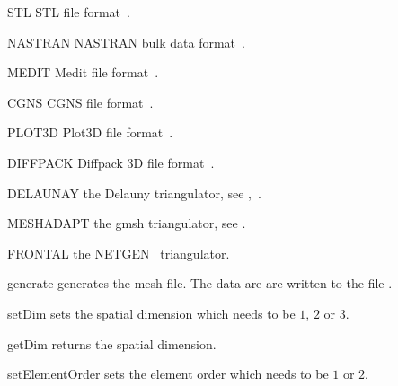 \begin{memberdesc}[Design]{STL}
STL file format~\cite{STL}. 
\end{memberdesc}
\begin{memberdesc}[Design]{NASTRAN}
NASTRAN  bulk data format~\cite{NASTRAN}.
\end{memberdesc}

\begin{memberdesc}[Design]{MEDIT}
Medit file format~\cite{MEDIT}. 
\end{memberdesc}

\begin{memberdesc}[Design]{CGNS}
CGNS file format~\cite{CGNS}. 
\end{memberdesc}

\begin{memberdesc}[Design]{PLOT3D}
Plot3D file format~\cite{PLOT3D}.  
\end{memberdesc}


\begin{memberdesc}[Design]{DIFFPACK}
Diffpack 3D file format~\cite{DIFFPACK}. 
\end{memberdesc}

\begin{memberdesc}[Design]{DELAUNAY}
the Delauny triangulator, see \gmshextern,~\cite{TETGEN}.
\end{memberdesc}

\begin{memberdesc}[Design]{MESHADAPT}
the gmsh triangulator, see \gmshextern.
\end{memberdesc}

\begin{memberdesc}[Design]{FRONTAL}
the NETGEN~\cite{NETGEN} triangulator.
\end{memberdesc}

\begin{methoddesc}[Design]{generate}{}
generates the mesh file. The data are are written to the file .
\end{methoddesc}


\begin{methoddesc}[Design]{setDim}{}
sets the spatial dimension which needs to be $1$, $2$ or $3$.
\end{methoddesc}

\begin{methoddesc}[Design]{getDim}{}
returns the spatial dimension.
\end{methoddesc}

\begin{methoddesc}[Design]{setElementOrder}{}
sets the element order which needs to be $1$ or $2$.
\end{methoddesc}

